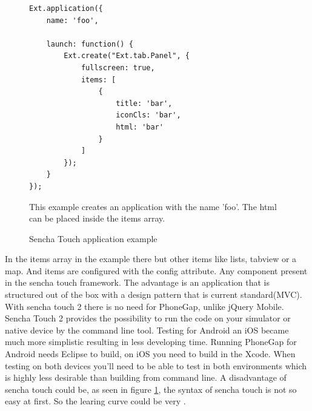 \documentclass[10pt,a4paper]{article}
\begin{document}
\begin{description}
\begin{figure}[h!]
\begin{lstlisting}
Ext.application({
    name: 'foo',

    launch: function() {
        Ext.create("Ext.tab.Panel", {
            fullscreen: true,
            items: [
                {
                    title: 'bar',
                    iconCls: 'bar',
                    html: 'bar'
                }
            ]
        });
    }
});
\end{lstlisting}
\label{fig:sencha}
\caption{Sencha Touch application example}
This example creates an application with the name 'foo'.  The html can be placed inside the items array. 
\end{figure}
\end{description}
In the items array in the example there but other items like lists, tabview or a map. And items are configured with the config attribute. Any component present in the sencha touch framework. The advantage is an application that is structured out of the box with a design pattern that is current standard(MVC). With sencha touch 2 there is no need for PhoneGap, unlike jQuery Mobile. Sencha Touch 2 provides the possibility to run the code on your simulator or native device by the command line tool. Testing for Android an iOS became much more simplistic resulting in less developing time. Running PhoneGap for Android needs Eclipse to build, on iOS you need to build in the Xcode. When testing on both devices you'll need to be able to test in both environments which is highly less desirable than building from command line. A disadvantage of sencha touch could be, as seen in figure \ref{fig:sencha}, the syntax of sencha touch is not so easy at first. So the learing curve could be very .
\end{document}
